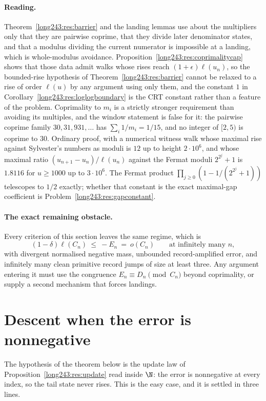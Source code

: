 \documentclass[11pt]{article}
\begin{document}
\paragraph{Reading.}
Theorem~\ref{long243:res:barrier} and the landing lemmas use about the multipliers only
that they are pairwise coprime, that they divide later denominator states, and
that a modulus dividing the current numerator is impossible at a landing, which
is whole-modulus avoidance.  Proposition~\ref{long243:res:coprimalitycap} shows that
those data admit walks whose rises reach $(1+\epsilon)\ell(u_n)$, so the
bounded-rise hypothesis of Theorem~\ref{long243:res:barrier} cannot be relaxed to a
rise of order $\ell(u)$ by any argument using only them, and the constant $1$
in Corollary~\ref{long243:res:loglogboundary} is the CRT constant rather than a feature
of the problem.  Coprimality to $m_i$ is a strictly stronger requirement than
avoiding its multiples, and the window statement is false for it: the pairwise
coprime family $30,31,931,\ldots$ has $\sum_i1/m_i=1/15$, and no integer of
$[2,5)$ is coprime to $30$.  Ordinary proof, with a numerical witness walk
whose maximal rise against Sylvester's numbers as moduli is $12$ up to height
$2\cdot10^6$, and whose maximal ratio $(u_{n+1}-u_n)/\ell(u_n)$ against the
Fermat moduli $2^{2^j}+1$ is $1.8116$ for $u\ge1000$ up to $3\cdot10^6$.  The
Fermat product $\prod_{j\ge0}(1-1/(2^{2^j}+1))$ telescopes to $1/2$ exactly;
whether that constant is the exact maximal-gap coefficient is
Problem~\ref{long243:res:gapconstant}.

\paragraph{The exact remaining obstacle.}
Every criterion of this section leaves the same regime, which is
\[
 (1-\delta)\ell(C_n)\ \le\ -E_n\ =\ o(C_n)
 \qquad\text{at infinitely many }n,
\]
with divergent normalised negative mass, unbounded record-amplified error, and
infinitely many clean primitive record jumps of size at least three.  Any
argument entering it must use the congruence $E_n\equiv D_n\pmod{C_n}$ beyond
coprimality, or supply a second mechanism that forces landings.

\section{Descent when the error is nonnegative}\label{long243:sec:descent}

The hypothesis of the theorem below is the update law of
Proposition~\ref{long243:res:update} read inside $\N$: the error is nonnegative at
every index, so the tail state never rises.  This is the easy case, and it is
settled in three lines.
\end{document}
